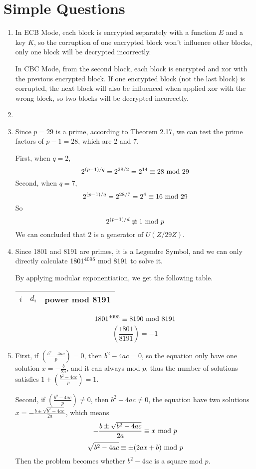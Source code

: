 \documentclass{article}
\renewcommand{\mod}{{\rm\ mod\ }}
\begin{document}
\section{Simple Questions}
\begin{enumerate}
\item
In ECB Mode, each block is encrypted separately with a function $E$ and a key $K$, so the corruption of one encrypted block won't influence other blocks, only one block will be decrypted incorrectly.

In CBC Mode, from the second block, each block is encrypted and xor with the previous encrypted block. If one encrypted block (not the last block) is corrupted, the next block will also be influenced when applied xor with the wrong block, so two blocks will be decrypted incorrectly.

\item



\item
Since $p=29$ is a prime, according to Theorem 2.17, we can test the prime factors of $p-1=28$, which are 2 and 7. 

First, when $q=2$, $$2^{(p-1)/q}=2^{28/2}=2^{14}\equiv28\mod 29$$
Second, when $q=7$, $$2^{(p-1)/q}=2^{28/7}=2^{4}\equiv16\mod 29$$
So $$2^{(p-1)/d}\not\equiv1\mod p$$
We can concluded that 2 is a generator of $U(Z/29Z)$.

\item
Since 1801 and 8191 are primes, it is a Legendre Symbol, and we can only directly calculate $1801^{4095}\mod8191$ to solve it.

By applying modular exponentiation, we get the following table.
\begin{center}
\begin{tabular}{ccc}
$i$ & $d_i$ & power mod 8191 \\\hline

\end{tabular}
\end{center}
$$1801^{4095}\equiv8190\mod8191$$
$$\left(\frac{1801}{8191}\right)=-1$$

\item
First, if $\left(\frac{b^2-4ac}{p}\right)=0$, then $b^2-4ac=0$, so the equation only have one solution $x=-\frac{b}{2a}$, and it can always mod $p$, thus the number of solutions satisfies $1+\left(\frac{b^2-4ac}{p}\right)=1$.

Second, if $\left(\frac{b^2-4ac}{p}\right)\neq0$, then $b^2-4ac\neq0$, the equation have two solutions $x=-\frac{b\pm\sqrt{b^2-4ac}}{2a}$, which means
$$-\frac{b\pm\sqrt{b^2-4ac}}{2a}\equiv x\mod p$$
$$\sqrt{b^2-4ac}\equiv \pm(2ax+b)\mod p$$
Then the problem becomes whether $b^2-4ac$ is a square mod $p$.


\end{enumerate}
\end{document}
